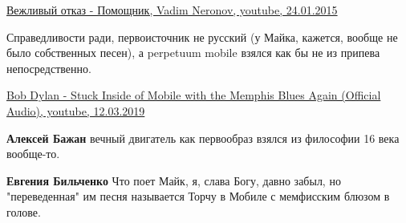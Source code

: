 \begin{itemize}
\begin{itemize}
\href{https://www.youtube.com/watch?v=Bq1CgKbye24}{%
Вежливый отказ - Помощник, Vadim Neronov, youtube, 24.01.2015%
}

\end{itemize} %


Справедливости ради, первоисточник не русский (у Майка, кажется, вообще не было
собственных песен), а perpetuum mobile взялся как бы не из припева
непосредственно.

\href{https://www.youtube.com/watch?v=3kh6K_-a0c4}{%
Bob Dylan - Stuck Inside of Mobile with the Memphis Blues Again (Official Audio), youtube, 12.03.2019%
}

\begin{itemize} %
\textbf{Алексей Бажан} вечный двигатель как первообраз взялся из философии 16 века вообще-то.

\textbf{Евгения Бильченко} Что поет Майк, я, слава Богу, давно забыл, но "переведенная" им песня называется Торчу в Мобиле с мемфисским блюзом в голове.
\end{itemize} %

\end{itemize} %
